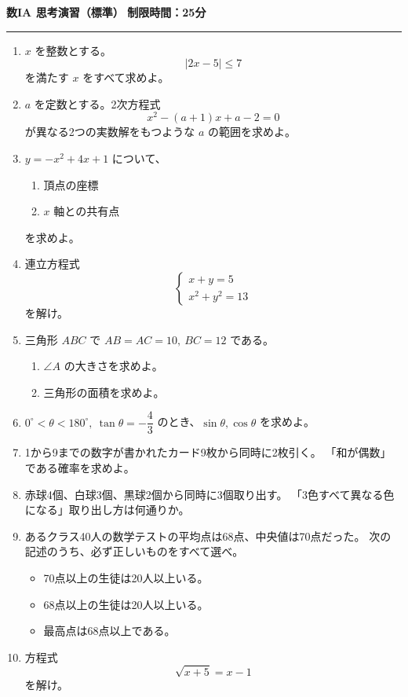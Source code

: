 \documentclass[lualatex,ja=standard]{bxjsarticle}
\begin{document}
\noindent\textbf{数IA 思考演習（標準）}
\hfill\textbf{制限時間：25分}
\hrule
\vspace{0.8em}

\begin{enumerate}
\item $x$ を整数とする。
\[
|2x-5|\le 7
\]
を満たす $x$ をすべて求めよ。

\item $a$ を定数とする。2次方程式
\[
x^2-(a+1)x+a-2=0
\]
が異なる2つの実数解をもつような $a$ の範囲を求めよ。

\item $y=-x^2+4x+1$ について、
\begin{enumerate}[label=(\arabic*)]
\item 頂点の座標
\item $x$ 軸との共有点
\end{enumerate}
を求めよ。

\item 連立方程式
\[
\begin{cases}
x+y=5\\
x^2+y^2=13
\end{cases}
\]
を解け。

\item 三角形 $ABC$ で $AB=AC=10,\ BC=12$ である。
\begin{enumerate}[label=(\arabic*)]
\item $\angle A$ の大きさを求めよ。
\item 三角形の面積を求めよ。
\end{enumerate}

\item $0^\circ<\theta<180^\circ,\ \tan\theta=-\dfrac{4}{3}$ のとき、$\sin\theta,\cos\theta$ を求めよ。

\item 1から9までの数字が書かれたカード9枚から同時に2枚引く。
「和が偶数」である確率を求めよ。

\item 赤球4個、白球3個、黒球2個から同時に3個取り出す。
「3色すべて異なる色になる」取り出し方は何通りか。

\item あるクラス40人の数学テストの平均点は68点、中央値は70点だった。
次の記述のうち、必ず正しいものをすべて選べ。
\begin{itemize}
\item[(ア)] 70点以上の生徒は20人以上いる。
\item[(イ)] 68点以上の生徒は20人以上いる。
\item[(ウ)] 最高点は68点以上である。
\end{itemize}

\item 方程式
\[
\sqrt{x+5}=x-1
\]
を解け。
\end{enumerate}
\end{document}
